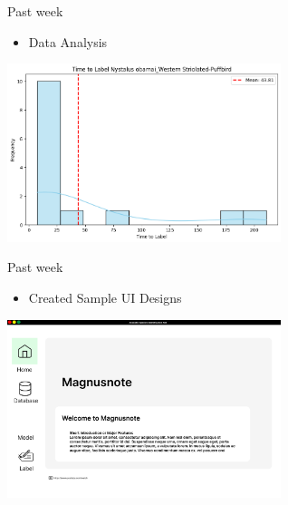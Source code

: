 


\begin{frame}{Past week}  
    \begin{itemize}
        \item Data Analysis
    \end{itemize}
    \centering
    \includegraphics[width=0.6\textwidth]{images/data analysis.png}  
\end{frame}

\begin{frame}{Past week} 
    \begin{itemize}
        \item Created Sample UI Designs
    \end{itemize}  
    \centering
    \includegraphics[width=0.6\textwidth]{images/sampleui1.png}  
\end{frame}

